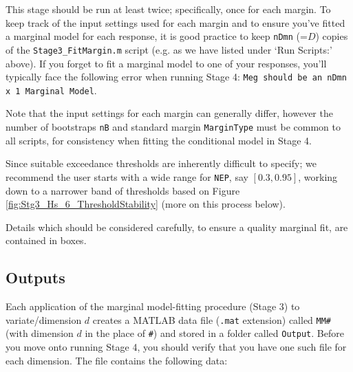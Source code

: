 This stage should be run at least twice; specifically, once for each margin. To keep track of the input settings used for each margin and to ensure you've fitted a marginal model for each response, it is good practice to keep \verb|nDmn| (=$D$) copies of the \verb|Stage3_FitMargin.m| script (e.g. as we have listed under `Run Scripts:' above). If you forget to fit a marginal model to one of your responses, you'll typically face the following error when running Stage 4: \verb|Meg should be an nDmn x 1 Marginal Model|. 

Note that the input settings for each margin can generally differ, however the number of bootstraps \verb|nB| and standard margin \verb|MarginType| must be common to all scripts, for consistency when fitting the conditional model in Stage 4. 

Since suitable exceedance thresholds are inherently difficult to specify; we recommend the user starts with a wide range for \verb|NEP|, say $[0.3,0.95]$, working down to a narrower band of thresholds based on Figure \ref{fig:Stg3_Hs_6_ThresholdStability} (more on this process below).

Details which should be considered carefully, to ensure a quality marginal fit, are contained in boxes. 

\subsection{Outputs}
Each application of the marginal model-fitting procedure (Stage 3) to variate/dimension $d$ creates a MATLAB data file (\verb|.mat| extension) called \verb|MM#| (with dimension $d$ in the place of \verb|#|) and stored in a folder called \verb|Output|. Before you move onto running Stage 4, you should verify that you have one such file for each dimension. The file contains the following data:

